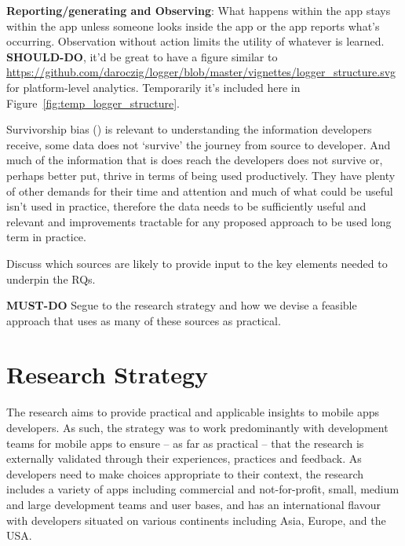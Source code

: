 \textbf{Reporting/generating and Observing}: What happens within the app stays within the app unless someone looks inside the app or the app reports what's occurring. Observation without action limits the utility of whatever is learned.  \textbf{SHOULD-DO}, it'd be great to have a figure similar to \url{https://github.com/daroczig/logger/blob/master/vignettes/logger_structure.svg} for platform-level analytics. Temporarily it's included here in Figure~\ref{fig:temp_logger_structure}.


Survivorship bias (\cite{wikipedia_survivorship_bias}) is relevant to understanding the information developers receive, some data does not `survive' the journey from source to developer. And much of the information that is does reach the developers does not survive or, perhaps better put, thrive in terms of being used productively. They have plenty of other demands for their time and attention and much of what could be useful isn't used in practice, therefore the data needs to be sufficiently useful and relevant and improvements tractable for any proposed approach to be used long term in practice.


Discuss which sources are likely to provide input to the key elements needed to underpin the RQs.

\textbf{MUST-DO} Segue to the research strategy and how we devise a feasible approach that uses as many of these sources as practical.


\section{Research Strategy}
The research aims to provide practical and applicable insights to mobile apps developers. As such, the strategy was to work predominantly with development teams for mobile apps to ensure -- as far as practical -- that the research is externally validated through their experiences, practices and feedback. As developers need to make choices appropriate to their context, the research includes a variety of apps including commercial and not-for-profit, small, medium and large development teams and user bases, and has an international flavour with developers situated on various continents including Asia, Europe, and the USA.

